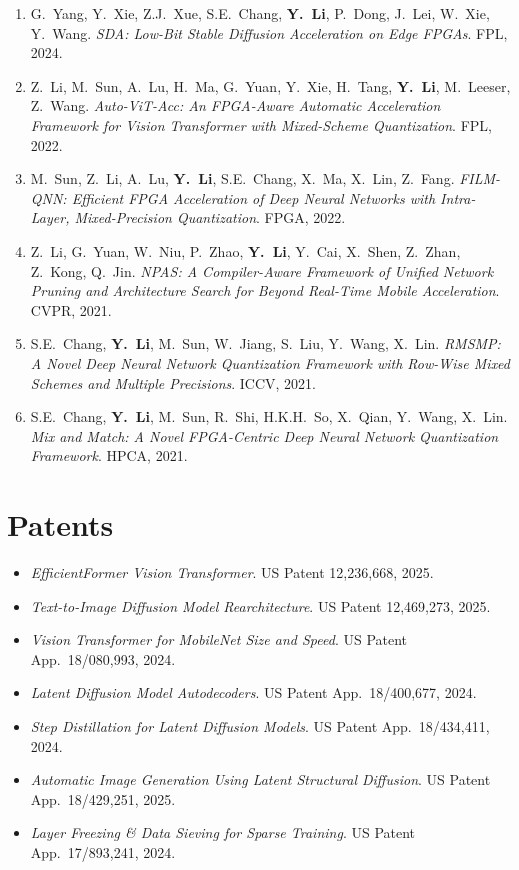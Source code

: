 \documentclass[11pt,letterpaper]{article}
\newcommand{\pub}[4]{%
    \item #1. \textit{#2}. #3, #4.
}
\begin{document}
\begin{enumerate}[resume]

\pub{G.\ Yang, Y.\ Xie, Z.J.\ Xue, S.E.\ Chang, \textbf{Y.\ Li}, P.\ Dong, J.\ Lei, W.\ Xie, Y.\ Wang}
    {SDA: Low-Bit Stable Diffusion Acceleration on Edge FPGAs}
    {FPL}{2024}

\pub{Z.\ Li, M.\ Sun, A.\ Lu, H.\ Ma, G.\ Yuan, Y.\ Xie, H.\ Tang, \textbf{Y.\ Li}, M.\ Leeser, Z.\ Wang}
    {Auto-ViT-Acc: An FPGA-Aware Automatic Acceleration Framework for Vision Transformer with Mixed-Scheme Quantization}
    {FPL}{2022}

\pub{M.\ Sun, Z.\ Li, A.\ Lu, \textbf{Y.\ Li}, S.E.\ Chang, X.\ Ma, X.\ Lin, Z.\ Fang}
    {FILM-QNN: Efficient FPGA Acceleration of Deep Neural Networks with Intra-Layer, Mixed-Precision Quantization}
    {FPGA}{2022}

\pub{Z.\ Li, G.\ Yuan, W.\ Niu, P.\ Zhao, \textbf{Y.\ Li}, Y.\ Cai, X.\ Shen, Z.\ Zhan, Z.\ Kong, Q.\ Jin}
    {NPAS: A Compiler-Aware Framework of Unified Network Pruning and Architecture Search for Beyond Real-Time Mobile Acceleration}
    {CVPR}{2021}

\pub{S.E.\ Chang, \textbf{Y.\ Li}, M.\ Sun, W.\ Jiang, S.\ Liu, Y.\ Wang, X.\ Lin}
    {RMSMP: A Novel Deep Neural Network Quantization Framework with Row-Wise Mixed Schemes and Multiple Precisions}
    {ICCV}{2021}

\pub{S.E.\ Chang, \textbf{Y.\ Li}, M.\ Sun, R.\ Shi, H.K.H.\ So, X.\ Qian, Y.\ Wang, X.\ Lin}
    {Mix and Match: A Novel FPGA-Centric Deep Neural Network Quantization Framework}
    {HPCA}{2021}

\end{enumerate}

\section{Patents}

\begin{itemize}
    \item \textit{EfficientFormer Vision Transformer}. US Patent 12,236,668, 2025.
    \item \textit{Text-to-Image Diffusion Model Rearchitecture}. US Patent 12,469,273, 2025.
    \item \textit{Vision Transformer for MobileNet Size and Speed}. US Patent App.\ 18/080,993, 2024.
    \item \textit{Latent Diffusion Model Autodecoders}. US Patent App.\ 18/400,677, 2024.
    \item \textit{Step Distillation for Latent Diffusion Models}. US Patent App.\ 18/434,411, 2024.
    \item \textit{Automatic Image Generation Using Latent Structural Diffusion}. US Patent App.\ 18/429,251, 2025.
    \item \textit{Layer Freezing \& Data Sieving for Sparse Training}. US Patent App.\ 17/893,241, 2024.
\end{itemize}
\end{document}

